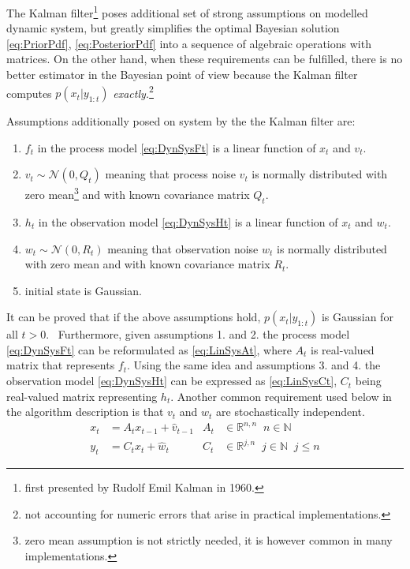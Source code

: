 The Kalman filter\footnote{first presented by Rudolf Emil Kalman in 1960.} poses additional set of strong
assumptions on modelled dynamic system, but greatly
simplifies the optimal Bayesian solution \eqref{eq:PriorPdf}, \eqref{eq:PosteriorPdf} into a
sequence of algebraic operations with matrices. On the other hand, when these requirements can be
fulfilled, there is no better estimator in the Bayesian point of view because the Kalman filter computes
\(p(x_t | y_{1:t})\) \emph{exactly.}\footnote{not accounting for numeric errors that arise in
practical implementations.}

Assumptions additionally posed on system by the the Kalman filter are:
\begin{enumerate}
	\item \(f_t\) in the process model \eqref{eq:DynSysFt} is a linear function of \(x_t\) and
	\(v_t\).
	\item \(v_t \sim \mathcal{N}(0, Q_t)\) meaning that process noise \(v_t\) is normally
	distributed with zero mean\footnote{zero mean assumption is not strictly needed, it is however
	common in many implementations.} and with known covariance matrix \(Q_t\).
	\item \(h_t\) in the observation model \eqref{eq:DynSysHt} is a linear function of \(x_t\) and
	\(w_t\).
	\item \(w_t \sim \mathcal{N}(0, R_t)\) meaning that observation noise \(w_t\) is normally distributed
	with zero mean and with known covariance matrix \(R_t\).
	\item initial state {\pdf} is Gaussian.
\end{enumerate}

It can be proved that if the above assumptions hold, \(p(x_t|y_{1:t})\) is Gaussian for all
\(t > 0\).~\cite{Pet:81} Furthermore, given assumptions 1. and 2. the process model
\eqref{eq:DynSysFt} can be reformulated as \eqref{eq:LinSysAt}, where \(A_t\) is real-valued matrix
that represents \(f_t\).
Using the same idea and assumptions 3. and 4. the observation model \eqref{eq:DynSysHt} can be
expressed as \eqref{eq:LinSysCt}, \(C_t\) being real-valued matrix representing \(h_t\). Another
common requirement used below in the algorithm description is that \(v_t\) and \(w_t\) are
stochastically independent.
\begin{align}
	x_t &= A_t x_{t-1} + \hat{v}_{t-1} & A_t &\in \mathbb{R}^{n,n} \;\; n \in \mathbb{N} \label{eq:LinSysAt} \\
	y_t &= C_t x_t + \hat{w}_t & C_t &\in \mathbb{R}^{j,n} \;\; j \in \mathbb{N} \;\; j \leq n \label{eq:LinSysCt}
\end{align}

